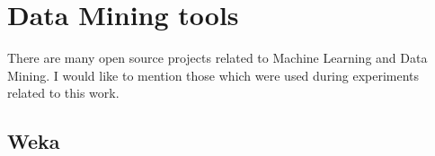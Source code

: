 



\section{Data Mining tools}
There are many open source projects related to Machine Learning and
Data Mining. I would like to mention those which were used during
experiments related to this work.

\subsection{Weka}

